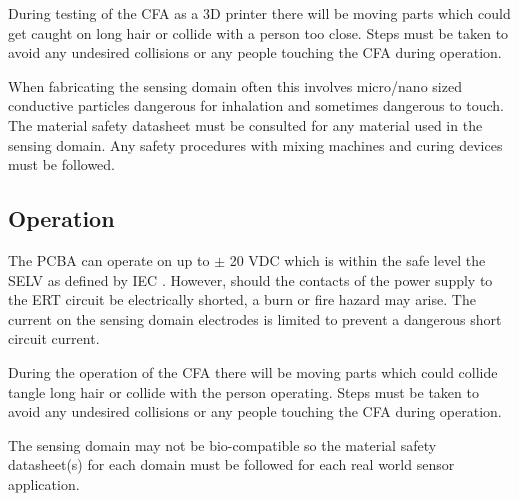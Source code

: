 During testing of the CFA as a 3D printer there will be moving parts which could get caught on long hair or collide with a person too close. Steps must be taken to avoid any undesired collisions or any people touching the CFA during operation.

When fabricating the sensing domain often this involves micro/nano sized conductive particles dangerous for inhalation and sometimes dangerous to touch. The material safety datasheet must be consulted for any material used in the sensing domain. Any safety procedures with mixing machines and curing devices must be followed.

\subsection{Operation}
The PCBA can operate on up to $\pm$ 20 VDC which is within the safe level the SELV as defined by IEC \cite{IEC2005}. However, should the contacts of the power supply to the ERT circuit be electrically shorted, a burn or fire hazard may arise. The current on the sensing domain electrodes is limited to prevent a dangerous short circuit current.

During the operation of the CFA there will be moving parts which could collide tangle long hair or collide with the person operating. Steps must be taken to avoid any undesired collisions or any people touching the CFA during operation.

The sensing domain may not be bio-compatible so the material safety datasheet(s) for each domain must be followed for each real world sensor application.
